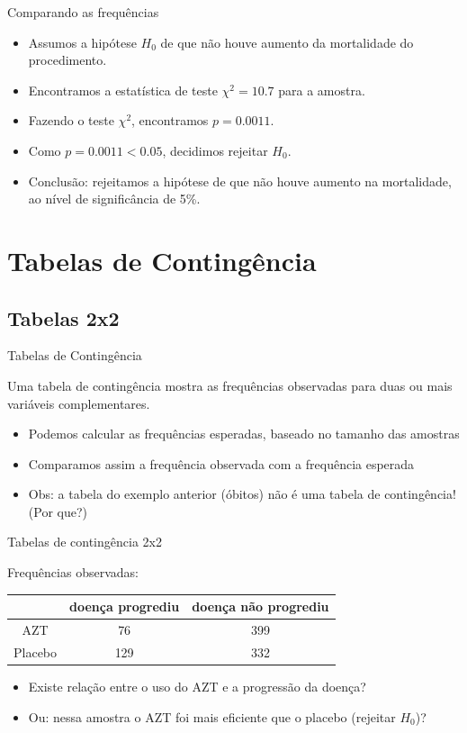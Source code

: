 \documentclass{beamer}
\begin{document}
\begin{frame}{Comparando as frequências}
  \begin{itemize}
  \item Assumos a hipótese $H_0$ de que não houve aumento da
    mortalidade do procedimento.
  \item Encontramos a estatística de teste $\chi^2 = 10.7$ para a
    amostra.
  \item Fazendo o teste $\chi^2$, encontramos $p=0.0011$.
  \item Como $p=0.0011 < 0.05$, decidimos \alert{rejeitar} $H_0$.
  \item Conclusão: rejeitamos a hipótese de que não houve aumento na
    mortalidade, ao nível de significância de 5\%.
  \end{itemize}
\end{frame}

\section{Tabelas de Contingência}

\subsection{Tabelas 2x2}


\begin{frame}{Tabelas de Contingência}
  \begin{definition}
    Uma \alert{tabela de contingência} mostra as frequências
    observadas para duas ou mais variáveis complementares.
  \end{definition}
  \begin{itemize}
  \item Podemos calcular as frequências esperadas, baseado no tamanho
    das amostras
  \item Comparamos assim a frequência observada com a frequência
    esperada
  \item Obs: a tabela do exemplo anterior (óbitos) \alert{não é} uma
    tabela de contingência! (Por que?)
  \end{itemize}
\end{frame}

\begin{frame}{Tabelas de contingência 2x2}
  \begin{example}
    Frequências observadas:
    \begin{tabular}{c|c|c}
      & doença progrediu & doença não progrediu\\
      \hline
      AZT & 76 & 399 \\
      \hline
      Placebo & 129 & 332 \\
    \end{tabular}
  \end{example}
  \begin{itemize}
  \item Existe relação entre o uso do AZT e a progressão da doença?
  \item Ou: nessa amostra o AZT foi mais eficiente que o placebo
    (rejeitar $H_0$)?
  \end{itemize}
\end{frame}
\end{document}
